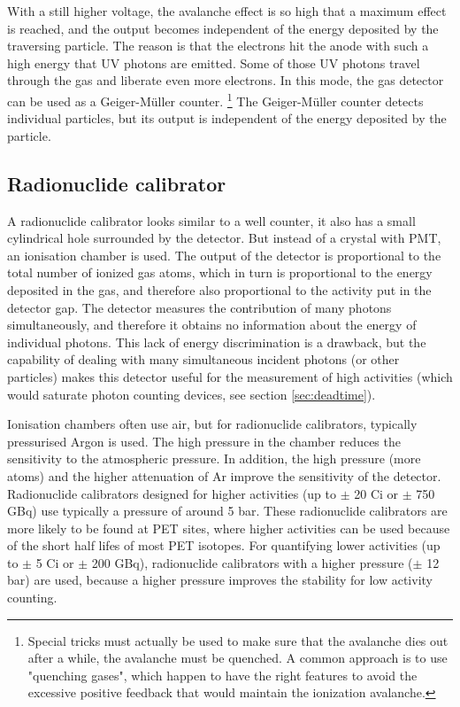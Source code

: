 \documentclass[11pt,oneside]{book}
\begin{document}
With a still higher voltage, the avalanche effect is so high that
a maximum effect is reached, and the output becomes independent of the
energy deposited by the traversing particle. The reason is that the
electrons hit the anode with such a high energy that UV photons are
emitted. Some of those UV photons travel through the gas and liberate
even more electrons. In this mode, the gas detector
can  be used as a Geiger-M\"uller counter.
%
\footnote{Special tricks must actually be used
to make sure that the avalanche dies out after a while, 
the avalanche must be quenched. A common approach is to
use "quenching gases", which happen to have the right features
to avoid the excessive positive feedback that would maintain the
ionization avalanche.}
%
The Geiger-M\"uller counter detects individual particles, but its
output is independent of the energy deposited by the particle.


\subsection{Radionuclide calibrator}
A radionuclide calibrator looks similar to a well counter, it also has a small
cylindrical hole surrounded by the detector. But instead of a crystal
with PMT, an ionisation chamber is used.
%
The output of the detector is proportional to the total number of
ionized gas atoms, which in turn is proportional to the energy
deposited in the gas, and therefore also proportional to the activity
put in the detector gap. The detector measures the contribution of
many photons simultaneously, and therefore it obtains no information
about the energy of individual photons. This lack of energy
discrimination is a drawback, but the capability of dealing with many
simultaneous incident photons (or other particles) makes this detector
useful for the measurement of high activities (which would saturate
photon counting devices, see section \ref{sec:deadtime}).

Ionisation chambers often use air, but for radionuclide calibrators, typically
pressurised Argon is used. The high pressure in the chamber reduces
the sensitivity to the atmospheric pressure. In addition, the high
pressure (more atoms) and the higher attenuation of Ar improve the
sensitivity of the detector. Radionuclide calibrators designed for higher
activities (up to $\pm$ 20 Ci or $\pm$ 750 GBq) use typically a
pressure of around 5 bar. These radionuclide calibrators are more likely to be
found at PET sites, where higher activities can be used because of the
short half lifes of most PET isotopes. For quantifying lower
activities (up to $\pm$ 5 Ci or $\pm$ 200 GBq), radionuclide calibrators with
a higher pressure ($\pm$ 12 bar) are used, because a higher pressure
improves the stability for low activity counting.
\end{document}
